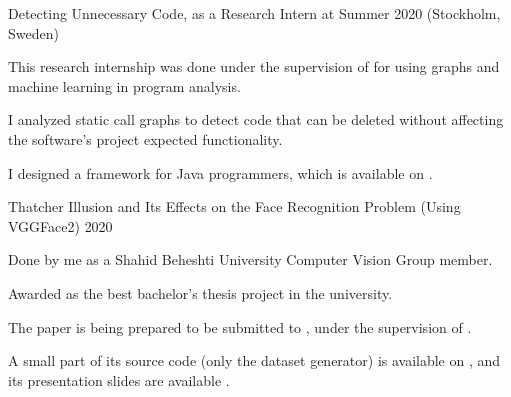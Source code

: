 

\begin{cvprojects}

  \cvproject
    {Detecting Unnecessary Code, as a Research Intern at }
    {}
    {}
    {Summer 2020 (Stockholm, Sweden)}
    {
      \begin{cvitems} %
        \item {This research internship was done under the supervision of  for using graphs and machine learning in program analysis.}
        \item {I analyzed static call graphs to detect code that can be deleted without affecting the software's project expected functionality.}
        \item {I designed a framework for Java programmers, which is available on .}
      \end{cvitems}
    }

  \cvproject
    {Thatcher Illusion and Its Effects on the Face Recognition Problem (Using VGGFace2)} %
    {} %
    {} %
    {2020} %
    {
      \begin{cvitems} %
        \item {Done by me as a Shahid Beheshti University Computer Vision Group member.}
        \item {Awarded as the best bachelor's thesis project in the university.}
        \item {The paper is being prepared to be submitted to , under the supervision of .}
        \item {A small part of its source code (only the dataset generator) is available on , and its presentation slides are available .}
      \end{cvitems}
    }


\end{cvprojects}
